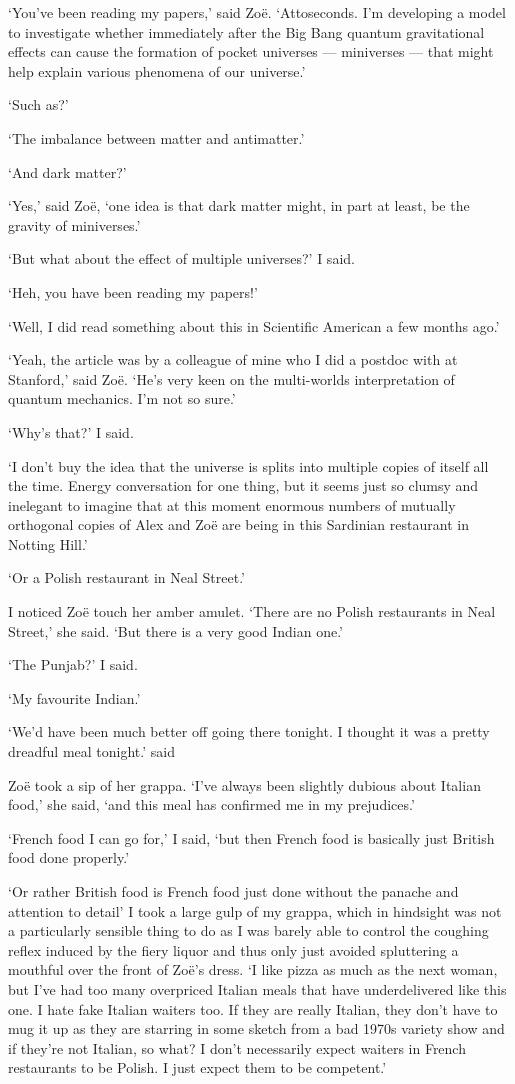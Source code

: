 `You've been reading my papers,' said Zoë. `Attoseconds. I'm developing a model
to investigate whether immediately after the Big Bang quantum
gravitational effects can cause the formation of pocket universes --- miniverses ---
that might help explain various phenomena of our universe.'

`Such as?'

`The imbalance between matter and antimatter.'

`And dark matter?'

`Yes,' said Zoë, `one idea is that dark matter might, in part at least, be the
gravity of miniverses.'

`But what about the effect of multiple universes?' I said.

`Heh, you {\twelveit have\/} been reading my papers!'

`Well, I did read something about this in {\twelvesl Scientific
American\/} a few months ago.'

`Yeah, the article was by a colleague of mine who I did a postdoc
with at Stanford,' said Zoë. `He's very keen on the multi-worlds interpretation of quantum mechanics. I'm not so sure.'

`Why's that?' I said.

`I don't buy the idea that the universe is splits
into multiple copies of itself all the time. Energy conversation for one
thing, but it seems just so clumsy and {\twelveit
inelegant} to imagine that at this moment enormous numbers of mutually orthogonal copies of Alex and Zoë are being in this Sardinian restaurant in Notting Hill.'

`Or a Polish restaurant in Neal Street.'

I noticed Zoë touch her amber amulet. `There are no Polish restaurants in Neal Street,' she said. `But there is a very good Indian one.'

`The Punjab?' I said.

`My favourite Indian.'

`We'd have been much better off going there tonight. I thought it was a pretty dreadful meal tonight.' said

Zoë took a sip of
her grappa. `I've always been slightly dubious about Italian food,' she said,
`and this meal has confirmed me in my prejudices.'

`French food I can go for,' I said, `but then French food is
basically just British food done properly.'

`Or rather British food is French food just done without
the panache and attention to detail' I took a large
gulp of my grappa, which in hindsight was not a particularly
sensible thing to do as I was barely able to control the coughing
reflex induced by the fiery liquor and thus only just avoided
spluttering a mouthful over the front of Zoë's dress. `I like
pizza as much as the next woman, but I've had too many overpriced
Italian meals that have underdelivered like this one. I hate fake
Italian waiters too. If they are really Italian, they don't have to
mug it up as they are starring in some sketch from a bad 1970s
variety show and if they're not Italian, so what? I don't
necessarily expect waiters in French restaurants to be Polish. I
just expect them to be competent.'


